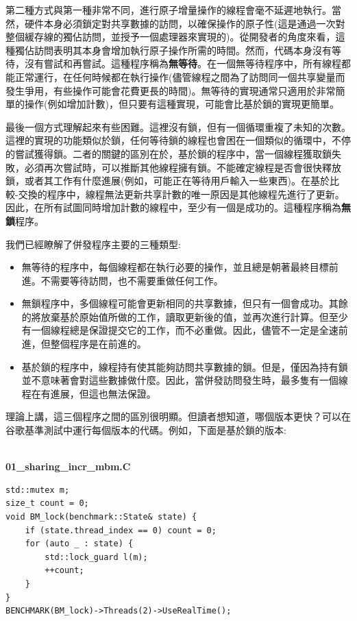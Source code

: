 第二種方式與第一種非常不同，進行原子增量操作的線程會毫不延遲地執行。當然，硬件本身必須鎖定對共享數據的訪問，以確保操作的原子性(這是通過一次對整個緩存線的獨佔訪問，並授予一個處理器來實現的)。從開發者的角度來看，這種獨佔訪問表明其本身會增加執行原子操作所需的時間。然而，代碼本身沒有等待，沒有嘗試和再嘗試。這種程序稱為\textbf{無等待}。在一個無等待程序中，所有線程都能正常運行，在任何時候都在執行操作(儘管線程之間為了訪問同一個共享變量而發生爭用，有些操作可能會花費更長的時間)。無等待的實現通常只適用於非常簡單的操作(例如增加計數)，但只要有這種實現，可能會比基於鎖的實現更簡單。

最後一個方式理解起來有些困難。這裡沒有鎖，但有一個循環重複了未知的次數。這裡的實現的功能類似於鎖，任何等待鎖的線程也會困在一個類似的循環中，不停的嘗試獲得鎖。二者的關鍵的區別在於，基於鎖的程序中，當一個線程獲取鎖失敗，必須再次嘗試時，可以推斷其他線程擁有鎖。不能確定線程是否會很快釋放鎖，或者其工作有什麼進展(例如，可能正在等待用戶輸入一些東西)。在基於比較-交換的程序中，線程無法更新共享計數的唯一原因是其他線程先進行了更新。因此，在所有試圖同時增加計數的線程中，至少有一個是成功的。這種程序稱為\textbf{無鎖}程序。

我們已經瞭解了併發程序主要的三種類型:

\begin{itemize}
\item 
無等待的程序中，每個線程都在執行必要的操作，並且總是朝著最終目標前進。不需要等待訪問，也不需要重做任何工作。

\item 
無鎖程序中，多個線程可能會更新相同的共享數據，但只有一個會成功。其餘的將放棄基於原始值所做的工作，讀取更新後的值，並再次進行計算。但至少有一個線程總是保證提交它的工作，而不必重做。因此，儘管不一定是全速前進，但整個程序是在前進的。

\item 
基於鎖的程序中，線程持有使其能夠訪問共享數據的鎖。但是，僅因為持有鎖並不意味著會對這些數據做什麼。因此，當併發訪問發生時，最多隻有一個線程在有進展，但這也無法保證。
\end{itemize}

理論上講，這三個程序之間的區別很明顯。但讀者想知道，哪個版本更快？可以在谷歌基準測試中運行每個版本的代碼。例如，下面是基於鎖的版本:

\hspace*{\fill} \\ %
\noindent
\textbf{01\_sharing\_incr\_mbm.C}
\begin{lstlisting}[style=styleCXX]
std::mutex m;
size_t count = 0;
void BM_lock(benchmark::State& state) {
	if (state.thread_index == 0) count = 0;
	for (auto _ : state) {
		std::lock_guard l(m);
		++count;
	}
}
BENCHMARK(BM_lock)->Threads(2)->UseRealTime();
\end{lstlisting}

